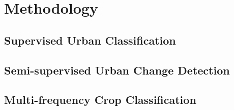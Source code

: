 \chapter{Methodology}

 

\section{Supervised Urban Classification} 
\label{sec:3_method_1}   
 

\section{Semi-supervised Urban Change Detection} 
\label{sec:3_method_2}
 

\section{Multi-frequency Crop Classification} 
\label{sec:3_method_3}
 



